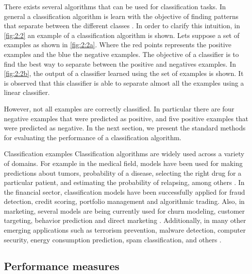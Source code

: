 There exists several algorithms that can be used for classification tasks. In general a 
classification algorithm is learn with the objective of finding patterns that separate between the 
different classes \citep{Hastie2009}. In order to clarify this intuition, in \figurename{ 
\ref{fig:2:2}} an example of a classification algorithm is shown. Lets suppose a set of examples as 
shown in \figurename{ \ref{fig:2:2a}}.  Where the red points represents the positive examples and 
the blue the negative examples. The objective of a classifier is to find the best way to separate 
between the positive and negatives examples. In \figurename{ \ref{fig:2:2b}}, the output of a 
classifier learned using the set of examples is shown. It is observed that this classifier is able 
to separate almost all the examples using a linear classifier. 

However, not all examples are correctly classified. In particular there are four negative examples 
that were predicted as positive, and five positive examples that were predicted as negative. In the 
next section, we present the standard methods for evaluating the performance of a classification 
algorithm.

\begin{remark}{Classification examples}
Classification algorithms are widely used across a variety of domains. For example in the 
medical field, models have been used for making predictions about tumors, probability 
of a disease, selecting the right drug for a particular patient, and estimating the probability of 
relapsing, among others \citep{Herland2014}. In the financial sector, classification models have 
been successfully applied for fraud detection, credit scoring, portfolio management and algorithmic 
trading. Also, in marketing, several models are being currently used for churn modeling, customer 
targeting, behavior prediction and direct marketing \citep{Baesens2014}. Additionally, in many 
other emerging applications such as terrorism prevention, malware detection, computer security, 
energy consumption prediction, spam classification, and others \citep{Kriegel2007}.
\end{remark}


\subsection{Performance measures}

